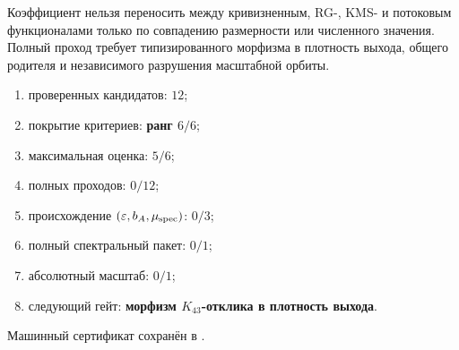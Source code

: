 \begin{nogocriterion}
Коэффициент нельзя переносить между кривизненным, RG-, KMS- и потоковым
функционалами только по совпадению размерности или численного значения.
Полный проход требует типизированного морфизма в плотность выхода, общего
родителя и независимого разрушения масштабной орбиты.
\end{nogocriterion}

\begin{protocol}\begin{enumerate}
\item проверенных кандидатов: \textbf{$12$};
\item покрытие критериев: \textbf{ранг $6/6$};
\item максимальная оценка: \textbf{$5/6$};
\item полных проходов: \textbf{$0/12$};
\item происхождение $(\varepsilon,b_A,\mu_{\rm spec})$: \textbf{$0/3$};
\item полный спектральный пакет: \textbf{$0/1$};
\item абсолютный масштаб: \textbf{$0/1$};
\item следующий гейт: \textbf{морфизм $K_{43}$-отклика в плотность выхода}.
\end{enumerate}\end{protocol}

Машинный сертификат сохранён в
.